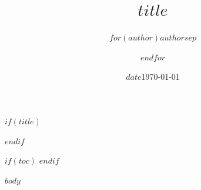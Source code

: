 \documentclass[
  $if(fontsize)$
    $fontsize$,
  $else$
    11pt,
  $endif$
  $if(lang)$
    $babel-lang$,
  $endif$
  $if(papersize)$
    $papersize$paper,
  $else$
    a4paper,
  $endif$
]{article}
\title{\textbf{$title$}}
\author{$for(author)$$author$$sep$ \and $endfor$}
\date{$date$}
\date{\today}
\begin{document}
$if(title)$
\maketitle
$endif$

$if(toc)$
\tableofcontents
\newpage
$endif$

$body$
\end{document}
